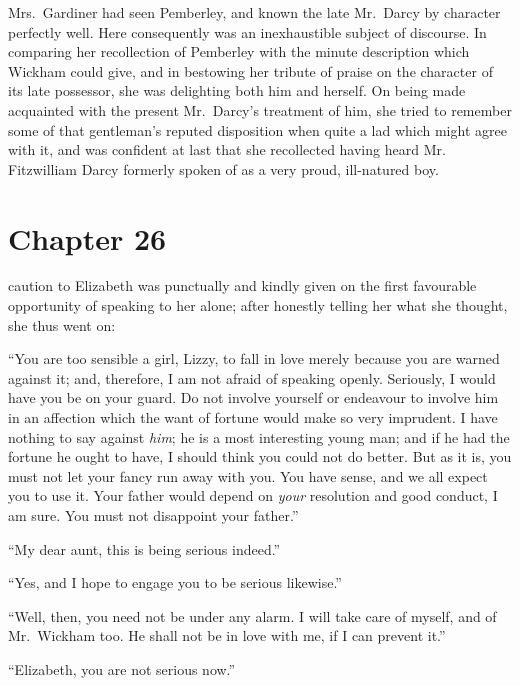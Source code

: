 Mrs.\ Gardiner had seen Pemberley, and known the late Mr.\ Darcy
by character perfectly well.  Here consequently was an
inexhaustible subject of discourse.  In comparing her recollection
of Pemberley with the minute description which Wickham could
give, and in bestowing her tribute of praise on the character of
its late possessor, she was delighting both him and herself.  On
being made acquainted with the present Mr.\ Darcy's treatment
of him, she tried to remember some of that gentleman's reputed
disposition when quite a lad which might agree with it, and was
confident at last that she recollected having heard Mr.\ %
Fitzwilliam Darcy formerly spoken of as a very proud, ill-natured
boy.



\chapter{Chapter 26}


 caution to Elizabeth was punctually and kindly
given on the first favourable opportunity of speaking to her
alone; after honestly telling her what she thought, she thus went
on:

``You are too sensible a girl, Lizzy, to fall in love merely because
you are warned against it; and, therefore, I am not afraid of
speaking openly.  Seriously, I would have you be on your guard.
Do not involve yourself or endeavour to involve him in an
affection which the want of fortune would make so very
imprudent.  I have nothing to say against \emph{him}; he is a most
interesting young man; and if he had the fortune he ought to
have, I should think you could not do better.  But as it is, you
must not let your fancy run away with you.  You have sense, and
we all expect you to use it.  Your father would depend on
\emph{your} resolution and good conduct, I am sure.  You must not
disappoint your father.''

``My dear aunt, this is being serious indeed.''

``Yes, and I hope to engage you to be serious likewise.''

``Well, then, you need not be under any alarm.  I will take care
of myself, and of Mr.\ Wickham too.  He shall not be in love with
me, if I can prevent it.''

``Elizabeth, you are not serious now.''

